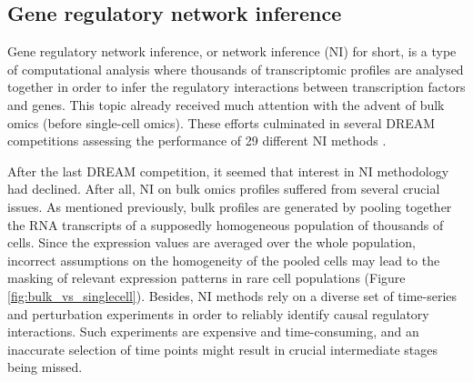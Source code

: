 \subsection{Gene regulatory network inference}
Gene regulatory network inference, or network inference (NI) for short, is a type of computational analysis where thousands of transcriptomic profiles are analysed together in order to infer the regulatory interactions between transcription factors and genes. This topic already received much attention with the advent of bulk omics (before single-cell omics). These efforts culminated in several DREAM competitions assessing the performance of 29 different NI methods \cite{marbach_revealingstrengthsweaknesses_2010, marbach_wisdomcrowdsrobust_2012}. 

After the last DREAM competition, it seemed that interest in NI methodology had declined. After all, NI on bulk omics profiles suffered from several crucial issues. As mentioned previously, bulk profiles are generated by pooling together the RNA transcripts of a supposedly homogeneous population of thousands of cells. Since the expression values are averaged over the whole population, incorrect assumptions on the homogeneity of the pooled cells may lead to the masking of relevant expression patterns in rare cell populations (Figure \ref{fig:bulk_vs_singlecell}). Besides, NI methods rely on a diverse set of time-series and perturbation experiments in order to reliably identify causal regulatory interactions. Such experiments are expensive and time-consuming, and an inaccurate selection of time points might result in crucial intermediate stages being missed.

